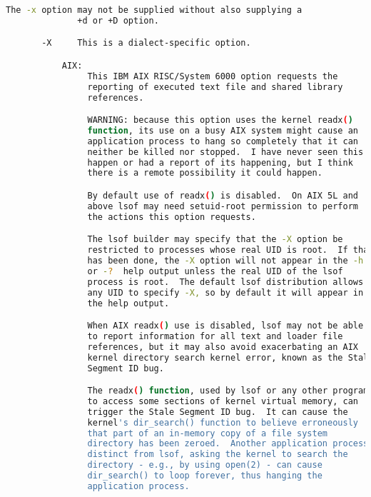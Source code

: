 {{\begin{lstlisting}[language=bash]
              The -x option may not be supplied without also supplying a
              +d or +D option.

       -X     This is a dialect-specific option.

           AIX:
                This IBM AIX RISC/System 6000 option requests the
                reporting of executed text file and shared library
                references.

                WARNING: because this option uses the kernel readx()
                function, its use on a busy AIX system might cause an
                application process to hang so completely that it can
                neither be killed nor stopped.  I have never seen this
                happen or had a report of its happening, but I think
                there is a remote possibility it could happen.

                By default use of readx() is disabled.  On AIX 5L and
                above lsof may need setuid-root permission to perform
                the actions this option requests.

                The lsof builder may specify that the -X option be
                restricted to processes whose real UID is root.  If that
                has been done, the -X option will not appear in the -h
                or -?  help output unless the real UID of the lsof
                process is root.  The default lsof distribution allows
                any UID to specify -X, so by default it will appear in
                the help output.

                When AIX readx() use is disabled, lsof may not be able
                to report information for all text and loader file
                references, but it may also avoid exacerbating an AIX
                kernel directory search kernel error, known as the Stale
                Segment ID bug.

                The readx() function, used by lsof or any other program
                to access some sections of kernel virtual memory, can
                trigger the Stale Segment ID bug.  It can cause the
                kernel's dir_search() function to believe erroneously
                that part of an in-memory copy of a file system
                directory has been zeroed.  Another application process,
                distinct from lsof, asking the kernel to search the
                directory - e.g., by using open(2) - can cause
                dir_search() to loop forever, thus hanging the
                application process.


\end{lstlisting}}}
